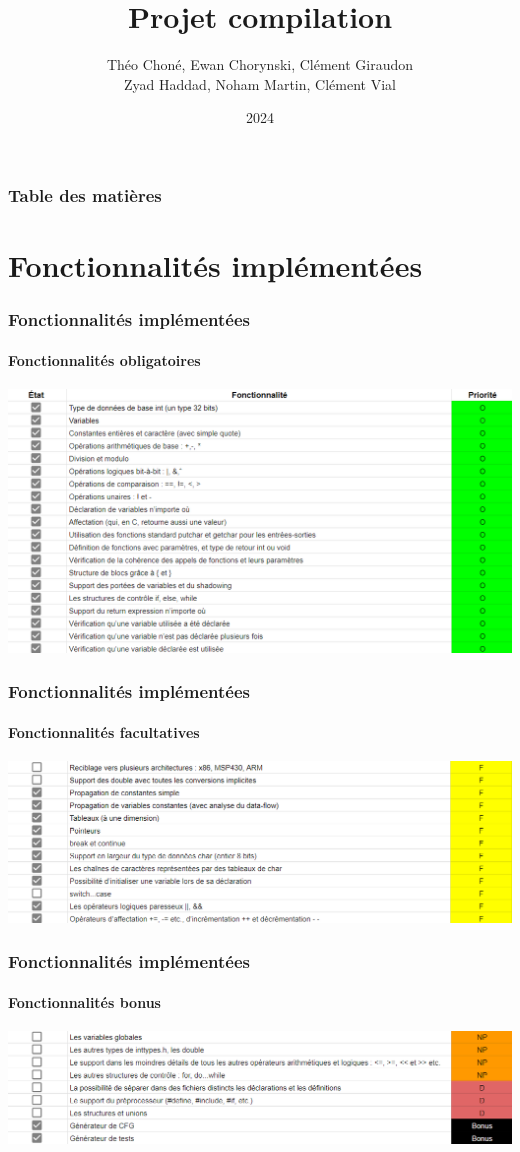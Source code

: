 \documentclass{beamer}
\title[Projet compilation]{Projet compilation}
\author[Hexanomnom]{Théo Choné, Ewan Chorynski, Clément Giraudon \\ Zyad Haddad, Noham Martin, Clément Vial}
\institute[INSA Lyon]{INSA Lyon}
\date{2024}
\begin{document}
\frame{\titlepage}

\begin{frame}
    \frametitle{Table des matières}
    \tableofcontents
\end{frame}

\section{Fonctionnalités implémentées}

\begin{frame}
    \frametitle{Fonctionnalités implémentées}
    \framesubtitle{Fonctionnalités obligatoires}
    \begin{center}
        \includegraphics[width=\textwidth,height=0.8\textheight,keepaspectratio]{fonctionnalite1.png}
    \end{center}
\end{frame}

\begin{frame}
    \frametitle{Fonctionnalités implémentées}
    \framesubtitle{Fonctionnalités facultatives}
    \begin{center}
        \includegraphics[width=\textwidth,height=0.8\textheight,keepaspectratio]{fonctionnalite2.png}
    \end{center}
\end{frame}

\begin{frame}
    \frametitle{Fonctionnalités implémentées}
    \framesubtitle{Fonctionnalités bonus}
    \begin{center}
        \includegraphics[width=\textwidth,height=0.8\textheight,keepaspectratio]{fonctionnalite3.png}
    \end{center}
\end{frame}
\end{document}
